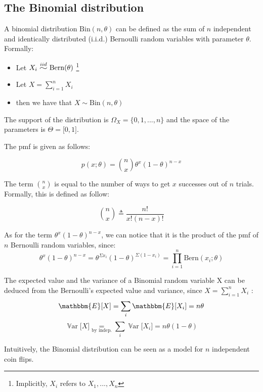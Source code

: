 \documentclass[12pt]{report}
\newcommand{\widesim}[2][1.5]{
  \mathrel{\overset{#2}{\scalebox{#1}[1]{$\sim$}}}
}
\newcommand{\defobj}[1]{\color{red}#1\color{black}{}}
\newcommand{\defmean}[1]{\color{green!70!black}#1\color{black}{}}
\renewcommand{\emph}[1]{\color{violet}#1\color{black}{}}
\DeclareMathOperator{\Var}{\mathbb{V}\text{ar}}
\newcommand{\Bern}{\text{Bern}}
\newcommand{\Bin}{\text{Bin}}
\begin{document}
\subsection{The Binomial distribution}
A \defobj{binomial distribution} $ \Bin (n, \theta)$ can be defined as the sum of $ n $ \emph{independent and identically distributed} (i.i.d.) Bernoulli random variables with parameter $ \theta $. Formally:

\begin{itemize}
  \item[] Let $ X_{i} \widesim{iid} \Bern (\theta) $ \footnote{ Implicitly, $ X_{i} $ refers to $ X_1,... ,X_n$  }
  \item[] Let $ X = \sum_{i = 1}^{n} X_{i} $ 
  \item[] then we have that $ X \sim \Bin(n, \theta)$
\end{itemize}

The support of the distribution is $ \Omega_{X} = \{ 0, 1, ..., n \} $ and the space of the parameters is $ \Theta = \lbrack 0, 1 \rbrack$.

The \emph{pmf} is given as follows:

\defmean{ $$ p(x; \theta) = \binom nx \theta^x (1 - \theta)^{n - x} $$ }

The term \defobj{$ \binom nx $} is equal to the number of ways to get $ x $ successes out of $ n $ trials. Formally, this is defined as follow:

\defmean{ $$ \binom nx \triangleq \frac{n!}{x! (n - x)!} $$ }

As for the term $ \theta^x (1 - \theta)^{n - x} $, we can notice that it is the product of the pmf of $ n $ Bernoulli random variables, since: 
$$ \theta^x (1 - \theta)^{n - x} = \theta^{{\Sigma x_i}} (1 - \theta)^{\Sigma (1 - x_i)} = \prod_{i=1}^{n} \Bern(x_i; \theta) $$

The expected value and the variance of a Binomial random variable X can be deduced from
the Bernoulli's expected value and variance, since $ X = \sum_{i = 1}^{n} X_{i} $ :
$$ \mathbbm{E}\lbrack X \rbrack = \sum_i \mathbbm{E}\lbrack X_i \rbrack = n \theta $$
$$ \Var\lbrack X \rbrack \underset{\text{by indep.}}{=} \sum_i \Var\lbrack X_i \rbrack = n \theta (1 - \theta)$$

Intuitively, the Binomial distribution can be seen as a model for $ n $ independent coin flips.
\end{document}
